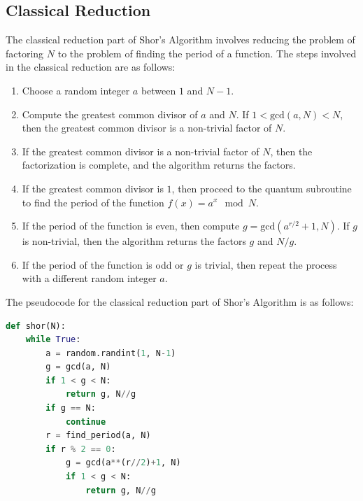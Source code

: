 \documentclass[12pt]{article}
\begin{document}
\subsection{Classical Reduction}
The classical reduction part of Shor's Algorithm involves reducing the problem of factoring $N$ to the problem of finding the period of a function. The steps involved in the classical reduction are as follows:
\begin{enumerate}
    \item Choose a random integer $a$ between $1$ and $N-1$.
    \item Compute the greatest common divisor of $a$ and $N$. If $1 < \text{gcd}(a, N) < N$, then the greatest common divisor is a non-trivial factor of $N$.
    \item If the greatest common divisor is a non-trivial factor of $N$, then the factorization is complete, and the algorithm returns the factors.
    \item If the greatest common divisor is $1$, then proceed to the quantum subroutine to find the period of the function $f(x) = a^x \mod N$.
    \item If the period of the function is even, then compute $g=\text{gcd}(a^{r/2}+1, N)$. If $g$ is non-trivial, then the algorithm returns the factors $g$ and $N/g$.
    \item If the period of the function is odd or $g$ is trivial, then repeat the process with a different random integer $a$.
\end{enumerate}
The pseudocode for the classical reduction part of Shor's Algorithm is as follows:
\begin{lstlisting}[language=Python, caption=Core Algorithm]
def shor(N):
    while True:
        a = random.randint(1, N-1)
        g = gcd(a, N)
        if 1 < g < N:
            return g, N//g
        if g == N:
            continue
        r = find_period(a, N)
        if r % 2 == 0:
            g = gcd(a**(r//2)+1, N)
            if 1 < g < N:
                return g, N//g
\end{lstlisting}
\end{document}
